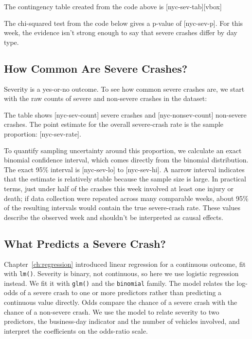 The contingency table created from the code above is
[nyc-sev-tab][vbox]

The chi-squared test from the code below gives a p-value of
[nyc-sev-p].
For this week, the evidence isn't strong enough to say that severe
crashes differ by day type.
\subsection{How Common Are Severe Crashes?}

Severity is a yes-or-no outcome. To see how common severe crashes are,
we start with the raw counts of severe and non-severe crashes in the
dataset:


The table shows
[nyc-sev-count]
severe crashes and
[nyc-nonsev-count]
non-severe crashes. The point estimate for the
overall severe-crash rate is the sample proportion:
[nyc-sev-rate].

To quantify sampling uncertainty around this proportion, we calculate an
exact binomial confidence interval,
which comes directly from the binomial distribution. The exact 95\%
interval is
[nyc-sev-lo]
to [nyc-sev-hi].
A narrow interval indicates that the estimate is relatively stable
because the sample size is large. In practical terms, just under half of
the crashes this week involved at least one injury or death; if data
collection were repeated across many comparable weeks, about 95\% of the
resulting intervals would contain the true severe-crash rate. These
values describe the observed week and shouldn't be interpreted as causal
effects.

\subsection{What Predicts a Severe Crash?}

Chapter~\ref{ch:regression} introduced linear regression for a
continuous outcome, fit with \lstinline{lm()}. Severity is binary, not
continuous, so here we use logistic
regression instead. We fit it with
\lstinline{glm()} and the \lstinline{binomial} family. The model relates
the log-odds of a severe crash to one or more predictors rather than
predicting a continuous value directly. Odds compare the chance of a
severe crash with the chance of a non-severe crash. We use the model
to relate severity to two predictors, the business-day
indicator and the number of vehicles involved, and interpret the
coefficients on the odds-ratio scale.

